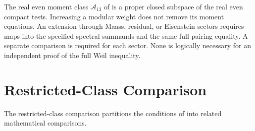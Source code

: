 \begin{remark}
\label{v4-arith:w5-direct:rem:what-not-proved}
The real even moment class $\mathscr A_{13}$ of
 is a proper closed subspace
of the real even compact tests. Increasing a modular weight does
not remove its moment equations. An extension through Maass,
residual, or Eisenstein sectors requires maps into the specified
spectral summands and the same full pairing equality. A separate
comparison is required for each sector. None is logically necessary
for an independent proof of the full Weil inequality.
\end{remark}
\section{Restricted-Class Comparison}
\label{v4-arith:w5-direct:construction~5-map}

The restricted-class comparison partitions the conditions of
 into related
mathematical comparisons.

